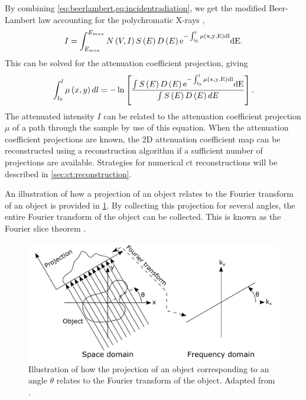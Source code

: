 By combining \cref{eq:beerlambert,eq:incidentradiation}, we get the modified Beer-Lambert law accounting for the polychromatic X-rays \cite{doi:10.1063/1.4950807}, 
\begin{equation}
    I = \int_{E_{min}}^{E_{max}}N\left(V,I\right)S\left(E\right)D\left(E\right)\rm{e}^{-\int_{l_0}^{l}\mu\left(x,y,E\right)dl}dE.
\end{equation}
This can be solved for the attenuation coefficient projection, giving \cite{doi:10.1063/1.4950807}
\begin{equation}
    \label{eq:ctattenuationcoefficient}
    \int_{l_0}^{l} \mu\left(x,y\right)dl = -\ln\left[\frac{\int S\left(E\right) D\left(E\right)\rm{e}^{-\int_{l_0}^{l}\mu\left(x,y,E\right)dl} dE }{ \int S\left(E\right) D\left(E\right) dE }\right].
\end{equation}
The attenuated intensity $I$ can be related to the attenuation coefficient projection $\mu$ of a path through the sample by use of this equation. When the attenuation coefficient projections are known, the 2D attenuation coefficient map can be reconstructed using a reconstruction algorithm if a sufficient number of projections are available. Strategies for numerical \gls{ct} reconstructions will be described in \cref{sec:ct:reconstruction}.

An illustration of how a projection of an object relates to the Fourier transform of an object is provided in \cref{fig:fourierslicetheorem}. By collecting this projection for several angles, the entire Fourier transform of the object can be collected. This is known as the Fourier slice theorem \cite[57]{KakSlaney98}.

\begin{figure}[htbp]  
    \centering
    \includegraphics[width=.8\textwidth]{figures/fourierslicetheorem.pdf}
    \caption[Illustration of the Fourier slice theorem]{Illustration of how the projection of an object corresponding to an angle $\theta$ relates to the Fourier transform of the object. Adapted from \cite{KakSlaney98}.}
    \label{fig:fourierslicetheorem}
\end{figure}

